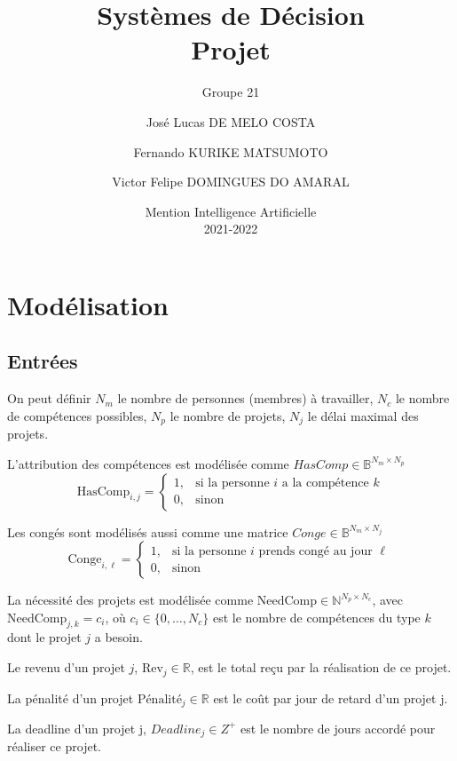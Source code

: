 \documentclass[12pt, a4paper, english, version=last, parskip=half, titlepage]{scrartcl}
\title{Systèmes de Décision \texorpdfstring{\\}{---} Projet}
\subtitle{Groupe 21}
\author{José Lucas DE MELO COSTA \and
Fernando KURIKE MATSUMOTO \and
Victor Felipe DOMINGUES DO AMARAL}
\date{Mention Intelligence Artificielle \\2021-2022}
\begin{document}
\maketitle
\tableofcontents

\section{Modélisation}

\subsection{Entrées}

On peut définir $N_m$ le nombre de personnes (membres) à travailler, $N_c$ le nombre de compétences possibles, $N_p$ le nombre de projets, $N_j$ le délai maximal des projets.

L'attribution des compétences est modélisée comme $HasComp \in \mathbb{B}^{N_m\times N_p}$
\begin{equation*}
    \text{HasComp}_{i,j} = 
    \begin{cases}
        1, & \text{si la personne $i$ a la compétence $k$} \\
        0, & \text{sinon}
    \end{cases}
\end{equation*}

Les congés sont modélisés aussi comme une matrice $Conge \in \mathbb{B}^{N_m \times N_j}$
\begin{equation*}
    \text{Conge}_{i,\ell} = 
    \begin{cases}
        1, & \text{si la personne $i$ prends congé au jour $\ell$} \\
        0, & \text{sinon}
    \end{cases}
\end{equation*}

La nécessité des projets est modélisée comme $\text{NeedComp} \in \mathbb{N}^{N_p \times N_c}$, avec $\text{NeedComp}_{j,k} =  c_i$, où $c_i \in \{0, \dots, N_c\}$ est le nombre de compétences du type $k$ dont le projet $j$ a besoin.

Le revenu d'un projet $j$, $\text{Rev}_j \in \mathbb{R}$, est le total reçu par la réalisation de ce projet.

La pénalité d'un projet $\text{Pénalité}_j \in \mathbb{R}$ est le coût par jour de retard d'un projet j.

La deadline d'un projet j, $Deadline_j \in Z^{+}$ est le nombre de jours accordé pour réaliser ce projet.
\end{document}

